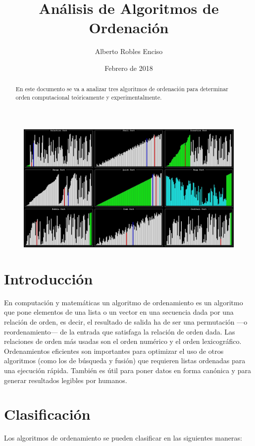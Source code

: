 \documentclass[8pt, A4]{article}    %
\title{Análisis de Algoritmos de Ordenación}
\author{Alberto Robles Enciso}
\date{Febrero de 2018}
\begin{document}
\maketitle

\begin{figure}[h]
\begin{center}
\includegraphics[width=1\textwidth]{graph/intro}
\end{center}
\end{figure}

\begin{abstract}
En este documento se va a analizar tres algoritmos de ordenación para determinar orden computacional teóricamente y experimentalmente.
\end{abstract}

\newpage

\tableofcontents

\newpage

\section{Introducción}
En computación y matemáticas un algoritmo de ordenamiento es un algoritmo que pone elementos de una lista o un vector en una secuencia dada por una relación de orden, es decir, el resultado de salida ha de ser una permutación —o reordenamiento— de la entrada que satisfaga la relación de orden dada. Las relaciones de orden más usadas son el orden numérico y el orden lexicográfico. Ordenamientos eficientes son importantes para optimizar el uso de otros algoritmos (como los de búsqueda y fusión) que requieren listas ordenadas para una ejecución rápida. También es útil para poner datos en forma canónica y para generar resultados legibles por humanos.

\section{Clasificación}
Los algoritmos de ordenamiento se pueden clasificar en las siguientes maneras:
\end{document}

